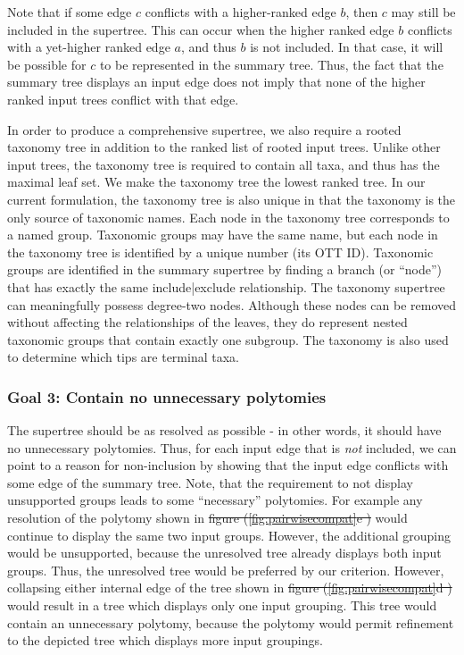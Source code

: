 \documentclass[fleqn,12pt,lineno,english]{wlpeerj}
\providecommand{\DIFaddtex}[1]{{\protect\color{blue}\uwave{#1}}} %
\providecommand{\DIFdeltex}[1]{{\protect\color{red}\sout{#1}}}                      %
\providecommand{\DIFaddbegin}{} %
\providecommand{\DIFaddend}{} %
\providecommand{\DIFdelbegin}{} %
\providecommand{\DIFdelend}{} %
\providecommand{\DIFadd}[1]{\texorpdfstring{\DIFaddtex{#1}}{#1}} %
\providecommand{\DIFdel}[1]{\texorpdfstring{\DIFdeltex{#1}}{}} %
\begin{document}
Note that if some edge $c$ conflicts with a higher-ranked edge $b$,
then $c$ may still be included in the supertree. This can occur when
the higher ranked edge $b$ conflicts with a yet-higher ranked edge
$a$, and thus $b$ is not included. In that case, it will be possible
for $c$ to be represented in the summary tree. Thus, the fact that
the summary tree displays an input edge does not imply that none of
the higher ranked input trees conflict with that edge. 

In order to produce a comprehensive supertree, we also require a rooted
taxonomy tree in addition to the ranked list of rooted input trees.
Unlike other input trees, the taxonomy tree is required to contain
all taxa, and thus has the maximal leaf set. We make the taxonomy
tree the lowest ranked tree. In our current formulation, the taxonomy
tree is also unique in that the taxonomy is the only source of taxonomic
names. Each node in the taxonomy tree corresponds to a named group.
Taxonomic groups may have the same name, but each node in the taxonomy
tree is identified by a unique number (its OTT ID). Taxonomic groups
are identified in the summary supertree by finding a branch (or ``node'')
that has exactly the same include|exclude relationship. The taxonomy
supertree can meaningfully possess degree-two nodes. Although these
nodes can be removed without affecting the relationships of the leaves,
they do represent nested taxonomic groups that contain exactly one
subgroup. The taxonomy is also used to determine which tips are terminal
taxa.

\subsubsection{Goal 3: Contain no unnecessary polytomies}

The supertree should be as resolved as possible - in other words,
it should have no unnecessary polytomies. Thus, for each input edge
that is \emph{not} included, we can point to a reason for non-inclusion
by showing that the input edge conflicts with some edge of the summary
tree. Note, that the requirement to not display unsupported groups
leads to some ``necessary'' polytomies. For example any resolution
of the polytomy shown in \DIFdelbegin \DIFdel{figure (\ref{fig:pairwisecompat}e ) }\DIFdelend \DIFaddbegin \DIFadd{Fig. \ref{fig:pairwisecompat}e }\DIFaddend would
continue to display the same two input groups. However, the additional
grouping would be unsupported, because the unresolved tree already
displays both input groups. Thus, the 
unresolved tree would be preferred by our criterion.
However, collapsing either internal edge of the tree shown in \DIFdelbegin \DIFdel{figure
(\ref{fig:pairwisecompat}d ) }\DIFdelend \DIFaddbegin \DIFadd{Fig.
\ref{fig:pairwisecompat}d }\DIFaddend would result in a tree which displays
only one input grouping. This tree would contain an unnecessary polytomy,
because the polytomy would permit refinement to the depicted tree
which displays more input groupings.
\end{document}
